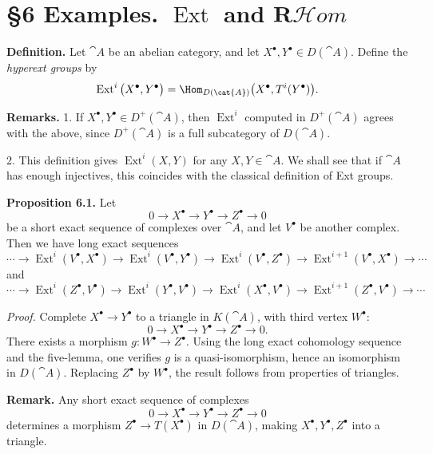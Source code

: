 \setcounter{page}{62}
\section{\S6 Examples. $\operatorname{Ext}$ and $\mathbf{R}\mathcal{H}\textit{om}$}

\textbf{Definition.}
Let \(\cat{A}\) be an abelian category, and let \(X^\bullet,Y^\bullet\in D(\cat{A})\).
Define the \textit{hyperext groups} by
\[
\operatorname{Ext}^i\big(X^\bullet,Y^\bullet\big)
= \Hom_{D(\cat{A})}\big(X^\bullet, T^i(Y^\bullet)\big).
\]

\textbf{Remarks.}
1. If \(X^\bullet,Y^\bullet\in D^+(\cat{A})\), then \(\operatorname{Ext}^i\) computed in \(D^+(\cat{A})\)
agrees with the above, since \(D^+(\cat{A})\) is a full subcategory of \(D(\cat{A})\).

2. This definition gives \(\operatorname{Ext}^i(X,Y)\) for any \(X,Y\in\cat{A}\).
We shall see that if \(\cat{A}\) has enough injectives, this coincides with the classical
definition of Ext groups.

\textbf{Proposition 6.1.}
Let
\[
0 \to X^\bullet \to Y^\bullet \to Z^\bullet \to 0
\]
be a short exact sequence of complexes over \(\cat{A}\), and let \(V^\bullet\) be another complex.
Then we have long exact sequences
\[
\cdots \to \operatorname{Ext}^i(V^\bullet,X^\bullet)
\to \operatorname{Ext}^i(V^\bullet,Y^\bullet)
\to \operatorname{Ext}^i(V^\bullet,Z^\bullet)
\to \operatorname{Ext}^{i+1}(V^\bullet,X^\bullet)
\to \cdots
\]
and
\[
\cdots \to \operatorname{Ext}^i(Z^\bullet,V^\bullet)
\to \operatorname{Ext}^i(Y^\bullet,V^\bullet)
\to \operatorname{Ext}^i(X^\bullet,V^\bullet)
\to \operatorname{Ext}^{i+1}(Z^\bullet,V^\bullet)
\to \cdots
\]

\setcounter{page}{63}
\textit{Proof.}
Complete \(X^\bullet\to Y^\bullet\) to a triangle in \(K(\cat{A})\), with third vertex \(W^\bullet\):
\[
0 \to X^\bullet \to Y^\bullet \to Z^\bullet \to 0.
\]
There exists a morphism \(g\colon W^\bullet\to Z^\bullet\). Using the long exact cohomology sequence
and the five-lemma, one verifies \(g\) is a quasi-isomorphism, hence an isomorphism in \(D(\cat{A})\).
Replacing \(Z^\bullet\) by \(W^\bullet\), the result follows from properties of triangles.

\textbf{Remark.}
Any short exact sequence of complexes
\[
0 \to X^\bullet \to Y^\bullet \to Z^\bullet \to 0
\]
determines a morphism \(Z^\bullet\to T(X^\bullet)\) in \(D(\cat{A})\), making \(X^\bullet,Y^\bullet,Z^\bullet\)
into a triangle.

